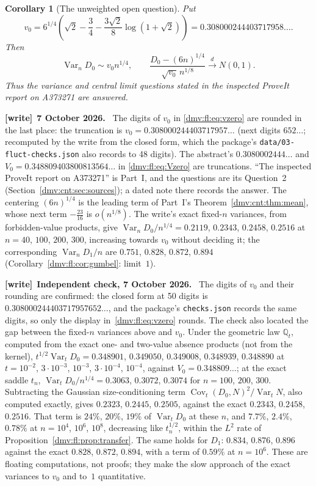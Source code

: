 \documentclass[11pt,letterpaper]{article}
\numberwithin{equation}{section}
\newtheorem{corollary}[theorem]{Corollary}
\theoremstyle{definition}\newtheorem{definition}[theorem]{Definition}
\theoremstyle{remark}\newtheorem{remark}[theorem]{Remark}
\newcommand{\file}[1]{\nolinkurl{#1}}
\newenvironment{writenote}[1][]{\par\smallskip\begingroup\small
 \noindent\textbf{[write]}\if\relax\detokenize{#1}\relax\else~\textbf{#1.}\fi\ }%
 {\par\endgroup\smallskip}
\newcommand{\Q}{\mathbb Q}
\newcommand{\dto}{\xrightarrow{\ d\ }}
\DeclareMathOperator{\Var}{Var}
\DeclareMathOperator{\Cov}{Cov}
\begin{document}
\begin{corollary}[The unweighted open question]\label{dmv:fl:cor:unweighted}
Put
\begin{equation}\label{dmv:fl:eq:vzero}
 v_0=6^{1/4}\left(\sqrt2-\frac34
       -\frac{3\sqrt2}{8}\log(1+\sqrt2)\right)
       =0.308000244403717958\ldots.
\end{equation}
Then
\[
 \Var_nD_0\sim v_0 n^{1/4},\qquad
 \frac{D_0-(6n)^{1/4}}{\sqrt{v_0}\,n^{1/8}}\dto N(0,1).
\]
Thus the variance and central limit questions stated in the inspected
ProveIt report on A373271 are answered.
\end{corollary}
\begin{writenote}[7 October 2026]
The digits of $v_0$ in \eqref{dmv:fl:eq:vzero} are rounded in the last
place: the truncation is $v_0=0.308000244403717957\ldots$ (next digits
$652\ldots$; recomputed by the write from the closed form, which the
package's \file{data/03-fluct-checks.json} also records to 48 digits). The
abstract's $0.3080002444\ldots$ and $V_0=0.348809403800813564\ldots$ in
\eqref{dmv:fl:eq:Vzero} are truncations. ``The inspected ProveIt report on
A373271'' is Part~I, and the questions are its Question~2
(Section~\ref{dmv:cnt:sec:sources}); a dated note there records the
answer. The centering $(6n)^{1/4}$ is the leading term of Part~I's
Theorem~\ref{dmv:cnt:thm:mean}, whose next term $-\tfrac{23}{16}$ is
$o(n^{1/8})$. The write's exact fixed-$n$ variances, from forbidden-value
products, give $\Var_nD_0/n^{1/4}=0.2119$, $0.2343$, $0.2458$, $0.2516$ at
$n=40$, $100$, $200$, $300$, increasing towards $v_0$ without deciding it;
the corresponding $\Var_nD_1/n$ are $0.751$, $0.828$, $0.872$, $0.894$
(Corollary~\ref{dmv:fl:cor:gumbel}: limit~$1$).
\end{writenote}
\begin{writenote}[Independent check, 7 October 2026]
The digits of $v_0$ and their rounding are confirmed: the closed form at 50
digits is $0.308000244403717957652\ldots$, and the package's
\file{checks.json} records the same digits, so only the display
in~\eqref{dmv:fl:eq:vzero} rounds. The check also located the gap between
the fixed-$n$ variances above and $v_0$. Under the geometric law $\Q_t$,
computed from the exact one- and two-value absence products (not from the
kernel), $t^{1/2}\Var_tD_0=0.348901$, $0.349050$, $0.349008$, $0.348939$,
$0.348890$ at $t=10^{-2}$, $3\cdot10^{-3}$, $10^{-3}$, $3\cdot10^{-4}$,
$10^{-4}$, against $V_0=0.348809\ldots$; at the exact saddle $t_n$,
$\Var_tD_0/n^{1/4}=0.3063$, $0.3072$, $0.3074$ for $n=100$, $200$, $300$.
Subtracting the Gaussian size-conditioning term
$\Cov_t(D_0,N)^2/\Var_tN$, also computed exactly, gives $0.2323$,
$0.2445$, $0.2505$, against the exact $0.2343$, $0.2458$, $0.2516$. That
term is $24\%$, $20\%$, $19\%$ of $\Var_tD_0$ at these $n$, and $7.7\%$,
$2.4\%$, $0.78\%$ at $n=10^4$, $10^6$, $10^8$, decreasing like
$t_n^{1/2}$, within the $L^2$ rate of
Proposition~\ref{dmv:fl:prop:transfer}. The same holds for $D_1$: $0.834$,
$0.876$, $0.896$ against the exact $0.828$, $0.872$, $0.894$, with a term
of $0.59\%$ at $n=10^6$. These are floating computations, not proofs; they
make the slow approach of the exact variances to $v_0$ and to~$1$
quantitative.
\end{writenote}
\end{document}
